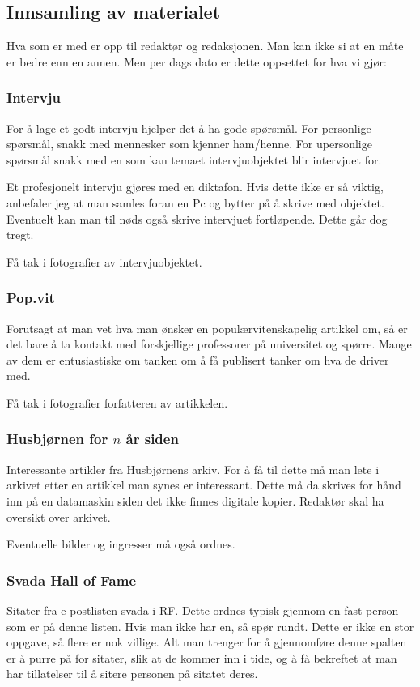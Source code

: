 \subsection{Innsamling av materialet}
 Hva som er med er opp til redaktør og redaksjonen. Man kan ikke si at
en måte er bedre enn en annen. Men per dags dato er dette oppsettet
for hva vi gjør:

\subsubsection{Intervju}
 For å lage et godt intervju hjelper det å ha gode spørsmål. For
personlige spørsmål, snakk med mennesker som kjenner ham/henne. For
upersonlige spørsmål snakk med en som kan temaet intervjuobjektet blir
intervjuet for.

 Et profesjonelt intervju gjøres med en diktafon. Hvis dette ikke er
så viktig, anbefaler jeg at man samles foran en Pc og bytter på å
skrive med objektet. Eventuelt kan man til nøds også skrive intervjuet
fortløpende. Dette går dog tregt.

 Få tak i fotografier av intervjuobjektet.

\subsubsection{Pop.vit}
 Forutsagt at man vet hva man ønsker en populærvitenskapelig artikkel
om, så er det bare å ta kontakt med forskjellige professorer på
universitet og spørre. Mange av dem er entusiastiske om tanken om å få
publisert tanker om hva de driver med.

 Få tak i fotografier forfatteren av artikkelen.

\subsubsection{Husbjørnen for $n$ år siden}
 Interessante artikler fra Husbjørnens arkiv. For å få til dette må
man lete i arkivet etter en artikkel man synes er interessant. Dette
må da skrives for hånd inn på en datamaskin siden det ikke finnes
digitale kopier. Redaktør skal ha oversikt over arkivet.

 Eventuelle bilder og ingresser må også ordnes.

\subsubsection{Svada Hall of Fame}
 Sitater fra e-postlisten svada i RF. Dette ordnes typisk gjennom en
fast person som er på denne listen. Hvis man ikke har en, så spør
rundt. Dette er ikke en stor oppgave, så flere er nok villige. Alt man
trenger for å gjennomføre denne spalten er å purre på for sitater,
slik at de kommer inn i tide, og å få bekreftet at man har tillatelser
til å sitere personen på sitatet deres.

